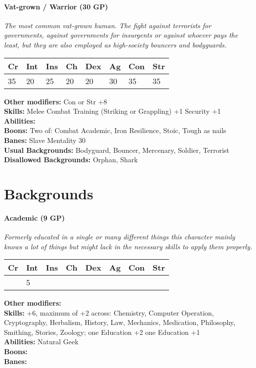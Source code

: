\documentclass[12pt,a4paper,openany]{book}
\begin{document}
	\hrulefill
	\paragraph*{Vat-grown / Warrior (30 GP)}
	\textit{The most common vat-grown human. The fight against terrorists for governments, against governments for insurgents or against whoever pays the least, but they are also employed as high-society bouncers and bodyguards.}\par
	\begin{tabular}{|l|l|l|l|l|l|l|l|}
		\hline
		Cr & Int & Ins & Ch & Dex & Ag & Con & Str \\ \hline
		35 & 20 & 25 & 20 & 20 & 30 & 35 & 35 \\ \hline
	\end{tabular}\par
	\noindent\textbf{Other modifiers:} Con or Str +8\\
	\textbf{Skills:} Melee Combat Training (Striking or Grappling) +1
	Security +1\\
	\textbf{Abilities:} \\
	\textbf{Boons:} Two of: Combat Academic, Iron Resilience, Stoic, Tough as nails\\
	\textbf{Banes:} Slave Mentality 30\\
	\textbf{Usual Backgrounds:} Bodyguard, Bouncer, Mercenary, Soldier, Terrorist\\
	\textbf{Disallowed Backgrounds:} Orphan, Shark
	\section{Backgrounds}
	\label{sec:backgroundlist}
	\paragraph*{Academic (9 GP)}
	\textit{Formerly educated in a single or many different things this character mainly knows a lot of things but might lack in the necessary skills to apply them properly.}\par
	\begin{tabular}{|l|l|l|l|l|l|l|l|}
		\hline
		Cr & Int & Ins & Ch & Dex & Ag & Con & Str \\ \hline
		& 5 &  &  &  &  &  &  \\ \hline
	\end{tabular}\par
	\noindent\textbf{Other modifiers:} \\
	\textbf{Skills:} +6, maximum of +2 across: Chemistry, Computer Operation, Cryptography, Herbalism, History, Law, Mechanics, Medication, Philosophy, Smithing, Stories, Zoology;
	one Education +2
	one Education +1\\
	\textbf{Abilities:} Natural Geek\\
	\textbf{Boons:} \\
	\textbf{Banes:} \\
	
\end{document}
